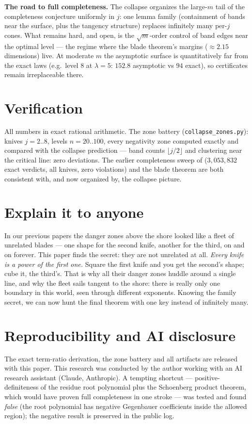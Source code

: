 \documentclass[11pt]{article}
\begin{document}
\textbf{The road to full completeness.} The collapse organizes the
large-$m$ tail of the completeness conjecture uniformly in $j$: one lemma
family (containment of bands near the surface, plus the tangency
structure) replaces infinitely many per-$j$ cones. What remains hard, and
open, is the $\sqrt m$-order control of band edges near the optimal level
--- the regime where the blade theorem's margins ($\approx2.15$ dimensions)
live. At moderate $m$ the asymptotic surface is quantitatively far from the
exact laws (e.g.\ level $8$ at $\lambda=5$: $152.8$ asymptotic vs $94$
exact), so certificates remain irreplaceable there.

\section{Verification}
All numbers in exact rational arithmetic. The zone battery
(\texttt{collapse\_zones.py}): knives $j=2..8$, levels $n=20..100$, every
negativity zone computed exactly and compared with the collapse prediction
--- band counts $\lfloor j/2\rfloor$ and clustering near the critical line:
zero deviations. The earlier completeness sweep of \cite{master}
($3{,}053{,}832$ exact verdicts, all knives, zero violations) and the blade
theorem \cite{blades} are both consistent with, and now organized by, the
collapse picture.

\section*{Explain it to anyone}
In our previous papers the danger zones above the shore looked like a fleet
of unrelated blades --- one shape for the second knife, another for the
third, on and on forever. This paper finds the secret: they are not
unrelated at all. \emph{Every knife is a power of the first one.} Square
the first knife and you get the second's shape; cube it, the third's. That
is why all their danger zones huddle around a single line, and why the
fleet sails tangent to the shore: there is really only one boundary in this
world, seen through different exponents. Knowing the family secret, we can
now hunt the final theorem with one key instead of infinitely many.

\section*{Reproducibility and AI disclosure}
The exact term-ratio derivation, the zone battery and all artifacts are
released with this paper. This research was conducted by the author working
with an AI research assistant (Claude, Anthropic). A tempting shortcut ---
positive-definiteness of the residue root polynomial plus the Schoenberg
product theorem, which would have proven full completeness in one stroke ---
was tested and found \emph{false} (the root polynomial has negative
Gegenbauer coefficients inside the allowed region); the negative result is
preserved in the public log.
\end{document}
